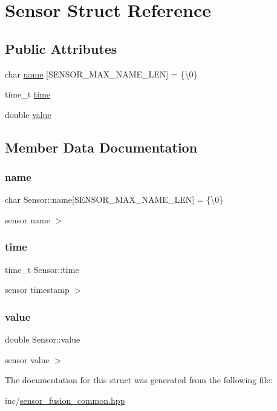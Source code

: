 \hypertarget{structSensor}{}\section{Sensor Struct Reference}
\label{structSensor}
\subsection*{Public Attributes}
\begin{DoxyCompactItemize}
\item 
char \hyperlink{structSensor_ad7c5fa63177c7549b6741f0147e4954a}{name} \mbox{[}S\+E\+N\+S\+O\+R\+\_\+\+M\+A\+X\+\_\+\+N\+A\+M\+E\+\_\+\+L\+EN\mbox{]} = \{\textquotesingle{}\textbackslash{}0\textquotesingle{}\}
\item 
time\+\_\+t \hyperlink{structSensor_a0951bc90ba6606ef51393a1e82b32b59}{time}
\item 
double \hyperlink{structSensor_a6b22400da2629283b9d3c63049313b71}{value}
\end{DoxyCompactItemize}


\subsection{Member Data Documentation}
\mbox{\label{structSensor_ad7c5fa63177c7549b6741f0147e4954a}} 
\subsubsection{\texorpdfstring{name}{name}}
{\footnotesize\ttfamily char Sensor\+::name\mbox{[}S\+E\+N\+S\+O\+R\+\_\+\+M\+A\+X\+\_\+\+N\+A\+M\+E\+\_\+\+L\+EN\mbox{]} = \{\textquotesingle{}\textbackslash{}0\textquotesingle{}\}}

sensor name $>$ \mbox{\label{structSensor_a0951bc90ba6606ef51393a1e82b32b59}} 
\subsubsection{\texorpdfstring{time}{time}}
{\footnotesize\ttfamily time\+\_\+t Sensor\+::time}

sensor timestamp $>$ \mbox{\label{structSensor_a6b22400da2629283b9d3c63049313b71}} 
\subsubsection{\texorpdfstring{value}{value}}
{\footnotesize\ttfamily double Sensor\+::value}

sensor value $>$ 

The documentation for this struct was generated from the following file\+:\begin{DoxyCompactItemize}
\item 
inc/\hyperlink{sensor__fusion__common_8hpp}{sensor\+\_\+fusion\+\_\+common.\+hpp}\end{DoxyCompactItemize}
